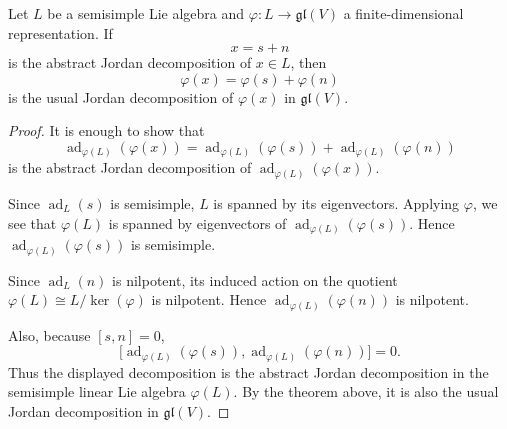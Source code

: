 \begin{corollary}
    Let $L$ be a semisimple Lie algebra and $\varphi\colon L\to \mathfrak{gl}(V)$
    a finite-dimensional representation.
    If
    \[
        x=s+n
    \]
    is the abstract Jordan decomposition of $x\in L$, then
    \[
        \varphi(x)=\varphi(s)+\varphi(n)
    \]
    is the usual Jordan decomposition of $\varphi(x)$ in $\mathfrak{gl}(V)$.
\end{corollary}

\begin{proof}
    It is enough to show that
    \[
        \operatorname{ad}_{\varphi(L)}(\varphi(x))
        =
        \operatorname{ad}_{\varphi(L)}(\varphi(s))
        +
        \operatorname{ad}_{\varphi(L)}(\varphi(n))
    \]
    is the abstract Jordan decomposition of
    $\operatorname{ad}_{\varphi(L)}(\varphi(x))$.

    Since $\operatorname{ad}_L(s)$ is semisimple, $L$ is spanned by its eigenvectors.
    Applying $\varphi$, we see that $\varphi(L)$ is spanned by eigenvectors of
    $\operatorname{ad}_{\varphi(L)}(\varphi(s))$. Hence
    $\operatorname{ad}_{\varphi(L)}(\varphi(s))$ is semisimple.

    Since $\operatorname{ad}_L(n)$ is nilpotent, its induced action on the quotient
    $\varphi(L) \cong L / \ker(\varphi)$ is nilpotent. Hence
    $\operatorname{ad}_{\varphi(L)}(\varphi(n))$ is nilpotent.

    Also, because $[s,n]=0$,
    \[
        \bigl[\operatorname{ad}_{\varphi(L)}(\varphi(s)),
            \operatorname{ad}_{\varphi(L)}(\varphi(n))\bigr]=0.
    \]
    Thus the displayed decomposition is the abstract Jordan decomposition in the
    semisimple linear Lie algebra $\varphi(L)$. By the theorem above, it is also the
    usual Jordan decomposition in $\mathfrak{gl}(V)$.
\end{proof}

